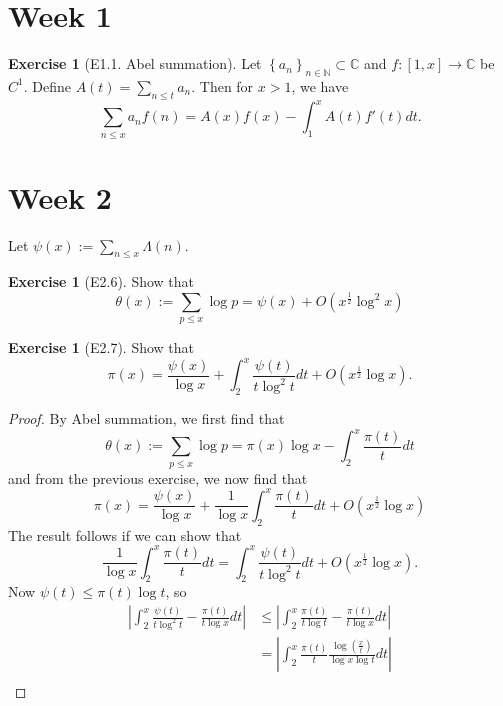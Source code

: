 \documentclass[reqno]{amsart}
\theoremstyle{definition}
\newtheorem{exercise}[theorem]{Exercise}
\theoremstyle{remark}
\begin{document}
\section{Week 1}

\begin{exercise}[E1.1. Abel summation]
    Let $\left\{ a_n \right\}_{n \in \mathbb{N} }\subset \mathbb{C}$ 
    and $f \colon \left[ 1,x \right] \to \mathbb{C}$ be
    $C^{1}$. Define $A(t) = \sum_{n \le t} a_n$. Then for
    $x>1$, we have
    \[
    \sum_{n\le x} a_n f(n) = A(x) f(x) -
    \int_{1}^{x} A(t) f'(t) dt. 
    \] 
\end{exercise}



\section{Week 2}

Let $\psi (x) :=
\sum_{n \le x} \Lambda (n)$.

\begin{exercise}[E2.6]
    Show that
    \[
    \theta(x) := 
    \sum_{p \le x} \log p = \psi (x) + O\left( x^{\frac{1}{2}}
    \log^2 x \right) 
    \] 
\end{exercise}

\begin{exercise}[E2.7]
    Show that
    \[
    \pi(x) = \frac{\psi (x)}{\log x}+ 
    \int_{2}^{x} \frac{\psi (t)}{t \log^2t}dt +
    O\left( x^{\frac{1}{2}} \log x \right) .
    \] 
\end{exercise}

\begin{proof}
    By Abel summation, we first find that
    \[
    \theta(x) :=
    \sum_{p \le x} \log p = 
    \pi(x) \log x - \int_{2}^{x} \frac{\pi(t)}{t}dt
    \] 
    and from the previous exercise, we now find
    that
    \[
    \pi(x) = \frac{\psi (x)}{\log x} +
    \frac{1}{\log x} \int_{2}^{x}\frac{\pi(t)}{t}dt 
    + O \left( x^{\frac{1}{2}} \log x \right) 
    \] 
    The result follows if we
    can show that
    \[
    \frac{1}{\log x} \int_{2}^{x} \frac{\pi(t)}{t}dt
    = \int_{2}^{x} \frac{\psi (t)}{t \log^2 t}dt 
    + O\left( x^{\frac{1}{2}} \log x \right).
    \] 
    Now $\psi (t) \le \pi(t) \log t$, so
    \begin{align*}
        \left| \int_{2}^{x} 
        \frac{\psi (t)}{t \log^2 t} - 
        \frac{\pi(t)}{t \log x}dt \right| 
        &\le 
        \left| \int_{2}^{x} \frac{\pi(t)}{t \log t} -
        \frac{\pi(t)}{t \log x} dt\right| \\
        &= \left| 
        \int_{2}^{x} \frac{\pi(t)}{t} 
        \frac{\log \left( \frac{x}{t} \right) }{\log x 
        \log t} dt\right| \\
    \end{align*}
\end{proof}
\end{document}
